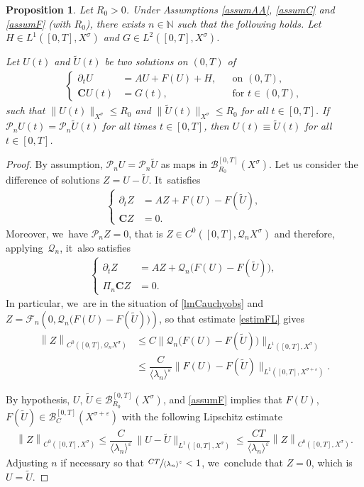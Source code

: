\documentclass[11pt]{article}
\newcommand\bnor[2]{\bigl\|#1\bigr\|_{#2}}%
\newtheorem{proposition}[theorem]{Proposition}
\theoremstyle{definition}
\let\mc\mathcal
\let\ld\lambda
\let\veps\varepsilon
\newcommand{\B}{\mc{B}}
\newcommand{\N}{\mathbb{N}}
\newcommand{\Q}{\mathcal{Q}}
\renewcommand{\P}{\mathcal{P}}
\newcommand{\bC}{\boldsymbol{C}}
\providecommand{\norm}[1]{\lVert#1\rVert}
\providecommand{\inn}[1]{\langle#1\rangle}
\newcommand\nor[2]{\left\|#1\right\|_{#2}}
\newcommand\FL{\mathcal{F}_{n}}
\begin{document}
\begin{proposition}\label{prop:finite-det-modes}
Let $R_{0}>0$. Under Assumptions \ref{assumAA}, \ref{assumC} and \ref{assumF} (with $R_{0}$), there exists $n\in \N$ such that the following holds. Let $H\in L^1([0,T],X^{\sigma})$ and $G\in L^2([0, T], X^\sigma)$.

Let $U(t)$ and $\widetilde{U}(t)$ be two solutions on $(0,T)$ of
\begin{align*}
\left\{\begin{aligned}
\partial_t U&=AU+F(U)+H, &&\text{on } (0, T), \\
\bC U(t)&=G(t), && \text{for } t\in (0, T),
\end{aligned}\right.
\end{align*}
such that $\norm{U(t)}_{X^\sigma}\leq R_{0}$ and $\norm{\widetilde{U}(t)}_{X^\sigma}\leq R_{0}$ for all $t\in [0, T]$. If $\P_n U(t)=\P_n \widetilde{U}(t)$ for all times $t\in [0, T]$, then $U(t)\equiv \widetilde{U}(t)$ for all $t\in [0, T]$.
\end{proposition}
\begin{proof}
By assumption, $\P_{n}U=\P_{n}\widetilde{U}$ as maps in $\B_{R_{0}}^{[0,T]}(X^{\sigma})$. Let us consider the difference of solutions $Z=U-\widetilde{U}$. It~satisfies
\begin{align*}
\left\{\begin{aligned}
\partial_t Z&=AZ+F(U)-F(\widetilde{U}), \\
\bC Z&=0.
\end{aligned}\right.
\end{align*}
Moreover, we~have $\P_n Z=0$, that is $Z\in C^{0}([0,T],\Q_{n}X^{\sigma})$ and therefore, applying~$\Q_n$, it~also satisfies
\begin{align*}
\left\{\begin{aligned}
\partial_t Z&=AZ+\Q_n \bigl(F(U)-F(\widetilde{U})\bigr), \\
\Pi_{n}\bC Z&=0.
\end{aligned}\right.
\end{align*}
In particular, we~are in the situation of \cref{lmCauchyobs} and $Z=\FL(0,\Q_n \big(F(U)-F(\widetilde{U})\big))$, so that estimate \eqref{estimFL} gives
\begin{align*}
\nor{Z}{C^{0}([0,T],\Q_{n}X^{\sigma})}&\leq C \bnor{\Q_n \bigl(F(U)-F(\widetilde{U})\bigr)}{L^{1}([0,T],X^{\sigma})}\\
&\leq \dfrac{C}{\inn{\ld_n}^\veps} \bnor{F(U)-F(\widetilde{U})}{L^{1}([0,T],X^{\sigma+\veps})}.
\end{align*}

By hypothesis, $U$, $\widetilde{U}\in \B_{R_0}^{[0, T]}(X^\sigma)$, and \cref{assumF} implies that $F(U)$, $F(\widetilde{U})\in \B_{C}^{[0,T]}(X^{\sigma+\veps})$ with the following Lipschitz estimate
\begin{align*}
\nor{Z}{C^{0}([0,T],X^{\sigma})}\leq \dfrac{C}{\inn{\ld_n}^\veps}\, \bnor{U-\widetilde{U}}{L^{1}([0,T],X^{\sigma})}\leq \dfrac{CT}{\inn{\ld_n}^\veps} \nor{Z}{C^{0}([0,T],X^{\sigma})}.
\end{align*}
Adjusting $n$ if necessary so that $\sfrac{CT}{\inn{\ld_n}^\veps}<1$, we~conclude that $Z=0$, which is $U= \widetilde{U}$.
\end{proof}
\end{document}
